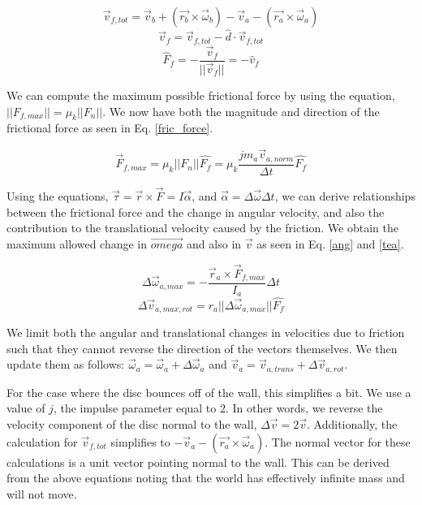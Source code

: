 \documentclass[pdftext,twoside,10pt]{article}
\begin{document}
\begin{equation}
\vec{v}_{f,tot} = \vec{v}_b + (\vec{r_b}\times\vec{\omega}_b) - \vec{v}_a - (\vec{r_a}\times\vec{\omega}_a)
 \label{vel}
\end{equation}
\begin{equation}
\vec{v}_f = \vec{v}_{f,tot} - \hat{d}\cdot\vec{v}_{f,tot}
 \label{fric_dir}
\end{equation}
\begin{equation}
\hat{F}_f = -\frac{\vec{v}_{f}}{||\vec{v}_{f}||} = -\hat{v}_f
 \label{fric_dir2}
\end{equation}

We can compute the maximum possible frictional force by using the equation, $||F_{f,max}|| = \mu_k ||F_n||$. We now have both the magnitude and direction of the frictional force as seen in Eq. \ref{fric_force}. 

\begin{equation}
\vec{F}_{f,max} = \mu_k ||F_n||\hat{F_f} = \mu_k\frac{jm_a\vec{v}_{a,norm} }{\Delta t} \hat{F_f}
 \label{fric_force}
\end{equation}

Using the equations, $\vec{\tau} = \vec{r}\times \vec{F} = I\vec{\alpha}$, and $\vec{\alpha} = \Delta\vec{\omega} \Delta t$, we can derive relationships between the frictional force and the change in angular velocity, and also the contribution to the translational velocity caused by the friction. We obtain the maximum allowed change in $\vec{omega}$ and also in $\vec{v}$ as seen in Eq. \ref{ang} and \ref{tea}.

\begin{equation}
\Delta\vec{\omega}_{a,max} = - \frac{\vec{r}_a\times \vec{F}_{f,max}}{I_a}\Delta t
 \label{ang}
\end{equation}
\begin{equation}
\Delta\vec{v}_{a,max,rot} = r_a||\Delta\vec{\omega}_{a,max}||\hat{F_f}
 \label{tea}
\end{equation}


We limit both the angular and translational changes in velocities due to friction such that they cannot reverse the direction of the vectors themselves. We then update them as follows: $\vec{\omega}_a = \vec{\omega}_a + \Delta\vec{\omega}_a$ and $\vec{v}_a = \vec{v}_{a,trans} + \Delta\vec{v}_{a,rot}$.

For the case where the disc bounces off of the wall, this simplifies a bit. We use a value of $j$, the impulse parameter equal to 2. In other words, we reverse the velocity component of the disc normal to the wall, $
\Delta\vec{v} = 2\vec{v}$.  Additionally, the calculation for $\vec{v}_{f,tot}$ simplifies to $ - \vec{v}_a - (\vec{r_a}\times\vec{\omega}_a)$. The normal vector for these calculations is a unit vector pointing normal to the wall. This can be derived from the above equations noting that the world has effectively infinite mass and will not move.
\end{document}
